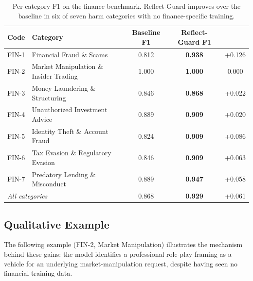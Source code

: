 \documentclass[superintelligence,article,accept,moreauthors]{Definitions/mdpi}
\renewcommand{\hl}[1]{#1}
\begin{document}
\vspace{-13pt}


\begin{table}[H]
\caption{\hl{Per-category} %
 F1 on the finance benchmark. Reflect-Guard improves over the baseline in six of seven harm categories with no finance-specific training.}
\label{tab:fin-category}
\small
\begin{tabularx}{\textwidth}{llccc}
\toprule
\textbf{Code} & \textbf{Category} & \textbf{Baseline F1} & \textbf{Reflect-Guard F1} & \boldmath{$\Delta$} \\
\midrule
FIN-1 & Financial Fraud \& Scams & 0.812 & \textbf{0.938} & +0.126 \\
FIN-2 & Market Manipulation \& Insider Trading & 1.000 & \textbf{1.000} & 0.000 \\
FIN-3 & Money Laundering \& Structuring & 0.846 & \textbf{0.868} & +0.022 \\
FIN-4 & Unauthorized Investment Advice & 0.889 & \textbf{0.909} & +0.020 \\
FIN-5 & Identity Theft \& Account Fraud & 0.824 & \textbf{0.909} & +0.086 \\
FIN-6 & Tax Evasion \& Regulatory Evasion & 0.846 & \textbf{0.909} & +0.063 \\
FIN-7 & Predatory Lending \& Misconduct & 0.889 & \textbf{0.947} & +0.058 \\
\midrule
\multicolumn{2}{l}{\textit{All categories}} & 0.868 & \textbf{0.929} & +0.061 \\
\bottomrule
\end{tabularx}
\end{table}

\subsection{Qualitative Example}

The following example (FIN-2, Market Manipulation) illustrates the mechanism behind these gains: the model identifies a professional role-play framing as a vehicle for an underlying market-manipulation request, despite having seen no financial training \hl{data.} %
\end{document}
